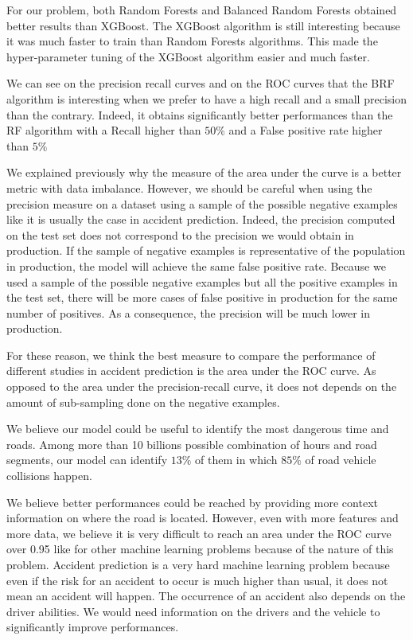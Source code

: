 \documentclass[conference]{IEEEtran}
\begin{document}
For our problem, both Random Forests and Balanced Random Forests obtained better results than XGBoost. The XGBoost algorithm is still interesting because it was much faster to train than Random Forests algorithms. This made the hyper-parameter tuning of the XGBoost algorithm easier and much faster. 

We can see on the precision recall curves and on the ROC curves that the BRF algorithm is interesting when we prefer to have a high recall and a small precision than the contrary.
Indeed, it obtains significantly better performances than the RF algorithm with a Recall higher than $50\%$ and a False positive rate higher than $5\%$ 

We explained previously why the measure of the area under the curve is a better metric with data imbalance. However, we should be careful when using the precision measure
on a dataset using a sample of the possible negative examples like it is usually
the case in accident prediction. Indeed, the precision computed on the test
set does not correspond to the precision we would obtain in production.
If the sample of negative examples is representative of the population
in production, the model will achieve the same false positive rate.
Because we used a sample of the possible negative examples but all the 
positive examples in the test set, there will be more cases of false positive
in production for the same number of positives. As a consequence, the precision
will be much lower in production.

For these reason, we think the best measure to compare the performance of
different studies in accident prediction is the area under the ROC curve.
As opposed to the area under the precision-recall curve, it does not depends
on the amount of sub-sampling done on the negative examples. 

We believe our model could be useful to identify the most dangerous
time and roads. Among more than 10 billions possible combination of
hours and road segments, our model can identify $13\%$ of them in which
$85\%$ of road vehicle collisions happen.

We believe better performances could be reached by providing more
context information on where the road is located. However, even with more
features and more data, we believe it is very difficult to reach an area under
the ROC curve over 0.95 like for other machine learning problems because of the nature 
of this problem. Accident prediction is a very hard machine learning problem 
because even if the risk for an accident to occur is much higher than usual, it 
does not mean an accident will happen. The occurrence of an accident also depends 
on the driver abilities. We would need information on the drivers and the vehicle
to significantly improve performances.
\end{document}
